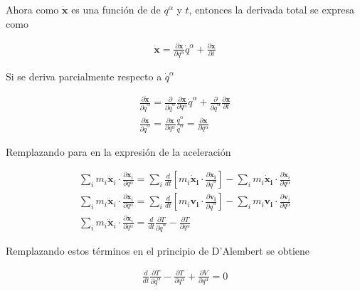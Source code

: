 Ahora como $\mathbf{\dot{x}}$ es una función de de $q^{\alpha}$ y $t$, entonces la derivada total se expresa como 

\begin{gather*}
    \mathbf{\dot{x}} = \frac{\partial \mathbf{x}}{\partial q^{\alpha}}\dot{q}^{\alpha} + \frac{\partial \mathbf{x}}{\partial t}
\end{gather*}

Si se deriva parcialmente respecto a $\dot{q}^{\alpha}$

\begin{gather*}
    \frac{\partial \mathbf{\dot{x}}}{\partial \dot{q}^{\alpha}} = \frac{\partial}{\partial \dot{q}^{\alpha}}\frac{\partial \mathbf{x}}{\partial q^{\alpha}}\dot{q}^{\alpha} + \frac{\partial}{\partial \dot{q}^{\alpha}}\frac{\partial \mathbf{x}}{\partial t}\\
    \frac{\partial \mathbf{\dot{x}}}{\partial \dot{q}^{\alpha}} = \frac{\partial \mathbf{x}}{\partial q^{\alpha}}\frac{\dot{q}^{\alpha}}{\dot{q}^{\alpha}} = \frac{\partial \mathbf{x}}{\partial q^{\alpha}}
\end{gather*}

Remplazando para en la expresión de la aceleración 
    
\begin{gather*}
    \sum_i m_i\ddot{\mathbf{x}}_i\cdot  \frac{\partial \mathbf{x}_i} {\partial q^{\alpha}} = \sum_i\frac{d}{dt}\left[m_i\mathbf{\dot{x}_i} \cdot  \frac{\partial \mathbf{\dot{x}_i}}{\partial \dot{q}^{\alpha}}\right] - \sum_im_i\mathbf{\dot{x}_i} \cdot \frac{\partial \mathbf{\dot{x}}_i}{\partial q^{\alpha}}\\ 
    \sum_i m_i\ddot{\mathbf{x}}_i\cdot  \frac{\partial \mathbf{x}_i} {\partial q^{\alpha}} = \sum_i\frac{d}{dt}\left[m_i\mathbf{v_i} \cdot  \frac{\partial \mathbf{v_i}}{\partial \dot{q}^{\alpha}}\right] - \sum_im_i\mathbf{v_i} \cdot \frac{\partial \mathbf{v}_i}{\partial q^{\alpha}}\\
    \sum_i m_i\ddot{\mathbf{x}}_i\cdot  \frac{\partial \mathbf{x}_i} {\partial q^{\alpha}} = \frac{d}{dt}  \frac{\partial T}{\partial \dot{q}^{\alpha}} -\frac{\partial T}{\partial q^{\alpha}}
\end{gather*}

Remplazando estos términos en el principio de D'Alembert se obtiene 

\begin{gather*}
    \frac{d}{dt}  \frac{\partial T}{\partial \dot{q}^{\alpha}} -\frac{\partial T}{\partial q^{\alpha}} + \frac{\partial V}{\partial q^{\alpha}}  = 0
\end{gather*}

